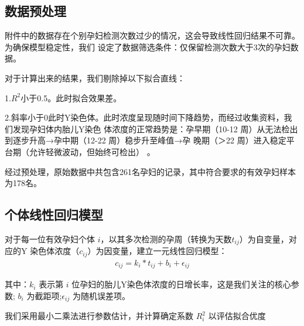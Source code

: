 \documentclass{article}
\begin{document}
\subsection{数据预处理}
附件中的数据存在个别孕妇检测次数过少的情况，这会导致线性回归结果不可靠。为确保模型稳定性，我们
设定了数据筛选条件：仅保留检测次数大于3次的孕妇数据。

对于计算出来的结果，我们剔除掉以下拟合直线：

1.$R^2$小于0.5。此时拟合效果差。

2.斜率小于0此时Y染色体。此时浓度呈现随时间下降趋势，而经过收集资料，我们发现孕妇体内胎儿Y染色
体浓度的正常趋势是：孕早期（10-12 周）从无法检出到逐步升高→孕中期（12-22 周）稳步升至峰值→孕
晚期（＞22 周）进入稳定平台期（允许轻微波动，但始终可检出） 。

经过预处理，原始数据中共包含261名孕妇的记录，其中符合要求的有效孕妇样本为178名。
\subsection{个体线性回归模型}
对于每一位有效孕妇个体 $i$，以其多次检测的孕周（转换为天数$t_{ij}$）为自变量，对应的Y
染色体浓度（$c_{ij}$）为因变量，建立一元线性回归模型：
\begin{gather}
    c_{ij}=k_i*t_{ij}+b_i+\epsilon_{ij} \tag{1}
\end{gather}

其中：$k_i$ 表示第 $i$ 位孕妇的胎儿Y染色体浓度的日增长率，这是我们关注的核心参数;
$b_i$ 为截距项;$\epsilon_{ij}$ 为随机误差项。

我们采用最小二乘法进行参数估计，并计算确定系数 $R^2_i$ 以评估拟合优度

\end{document}
